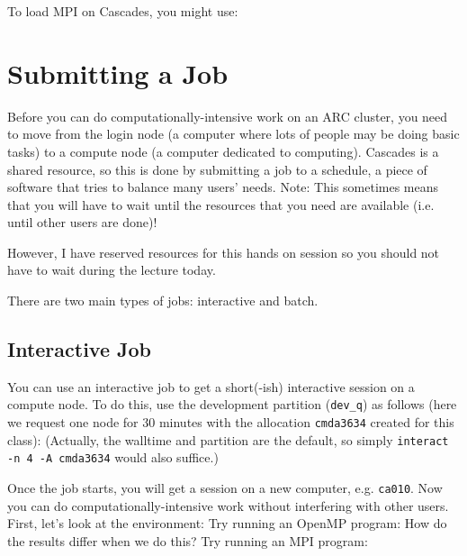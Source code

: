 To load MPI on Cascades, you might use:

\section{Submitting a Job}
Before you can do computationally-intensive work on an ARC cluster, you need to move from the login node (a computer where lots of people may be doing basic tasks) to a compute node (a computer dedicated to computing). Cascades is a shared resource, so this is done by submitting a job to a schedule, a piece of software that tries to balance many users' needs. Note: This sometimes means that you will have to wait until the resources that you need are available (i.e. until other users are done)!

However, I have reserved resources for this hands on session so you should not have to wait during the lecture today.

There are two main types of jobs: interactive and batch.

\subsection{Interactive Job}
You can use an interactive job to get a short(-ish) interactive session on a compute node. To do this, use the development partition (\texttt{dev\_q}) as follows (here we request one node for 30 minutes with the allocation \texttt{cmda3634} created for this class):
(Actually, the walltime and partition are the default, so simply \texttt{interact -n 4 -A cmda3634} would also suffice.) 

Once the job starts, you will get a session on a new computer, e.g. \texttt{ca010}. Now you can do computationally-intensive work without interfering with other users. First, let's look at the environment:
Try running an OpenMP program:
How do the results differ when we do this?
Try running an MPI program:



